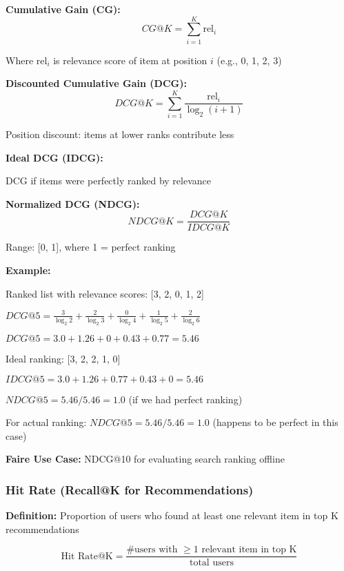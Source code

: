 \documentclass[11pt,letterpaper]{article}
\begin{document}
\textbf{Cumulative Gain (CG):}
\begin{equation}
CG@K = \sum_{i=1}^{K} \text{rel}_i
\end{equation}

Where $\text{rel}_i$ is relevance score of item at position $i$ (e.g., 0, 1, 2, 3)

\textbf{Discounted Cumulative Gain (DCG):}
\begin{equation}
DCG@K = \sum_{i=1}^{K} \frac{\text{rel}_i}{\log_2(i + 1)}
\end{equation}

Position discount: items at lower ranks contribute less

\textbf{Ideal DCG (IDCG):}

DCG if items were perfectly ranked by relevance

\textbf{Normalized DCG (NDCG):}
\begin{equation}
NDCG@K = \frac{DCG@K}{IDCG@K}
\end{equation}

Range: [0, 1], where 1 = perfect ranking

\textbf{Example:}

Ranked list with relevance scores: [3, 2, 0, 1, 2]

$DCG@5 = \frac{3}{\log_2 2} + \frac{2}{\log_2 3} + \frac{0}{\log_2 4} + \frac{1}{\log_2 5} + \frac{2}{\log_2 6}$

$DCG@5 = 3.0 + 1.26 + 0 + 0.43 + 0.77 = 5.46$

Ideal ranking: [3, 2, 2, 1, 0]

$IDCG@5 = 3.0 + 1.26 + 0.77 + 0.43 + 0 = 5.46$

$NDCG@5 = 5.46 / 5.46 = 1.0$ (if we had perfect ranking)

For actual ranking: $NDCG@5 = 5.46 / 5.46 = 1.0$ (happens to be perfect in this case)

\textbf{Faire Use Case:} NDCG@10 for evaluating search ranking offline

\subsubsection{Hit Rate (Recall@K for Recommendations)}

\textbf{Definition:} Proportion of users who found at least one relevant item in top K recommendations

\begin{equation}
\text{Hit Rate@K} = \frac{\text{\# users with } \geq 1 \text{ relevant item in top K}}{\text{total users}}
\end{equation}
\end{document}
